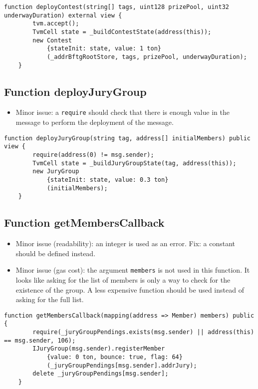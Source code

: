 \begin{lstlisting}[firstnumber=98]
    function deployContest(string[] tags, uint128 prizePool, uint32 underwayDuration) external view {
        tvm.accept();
        TvmCell state = _buildContestState(address(this));
        new Contest
            {stateInit: state, value: 1 ton}
            (_addrBftgRootStore, tags, prizePool, underwayDuration);
    }
\end{lstlisting}

\subsection{Function deployJuryGroup}

\begin{itemize}
\item Minor issue: a {\tt require} should check that there is enough
  value in the message to perform the deployment of the message.
\end{itemize}

\begin{lstlisting}[firstnumber=112]
    function deployJuryGroup(string tag, address[] initialMembers) public view {
        require(address(0) != msg.sender);
        TvmCell state = _buildJuryGroupState(tag, address(this));
        new JuryGroup
            {stateInit: state, value: 0.3 ton}
            (initialMembers);
    }
\end{lstlisting}

\subsection{Function getMembersCallback}

\begin{itemize}
\item Minor issue (readability): an integer is used as an error. Fix:
  a constant should be defined instead.
\item Minor issue (gas cost): the argument {\tt members} is not used
  in this function. It looks like asking for the list of members is
  only a way to check for the existence of the group. A less expensive
  function should be used instead of asking for the full list.
\end{itemize}

\begin{lstlisting}[firstnumber=130]
    function getMembersCallback(mapping(address => Member) members) public {
        require(_juryGroupPendings.exists(msg.sender) || address(this) == msg.sender, 106);
        IJuryGroup(msg.sender).registerMember
            {value: 0 ton, bounce: true, flag: 64}
            (_juryGroupPendings[msg.sender].addrJury);
        delete _juryGroupPendings[msg.sender];
    }
\end{lstlisting}

